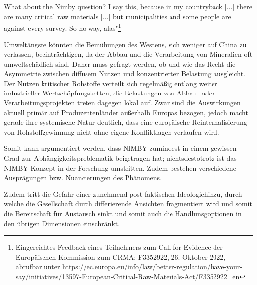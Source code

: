 \documentclass[12pt,a4paper,oneside]{book} %
\begin{document}
{\glqq What about the Nimby question? I say this, because in my countryback [...] there are many critical raw materials [...] but municipalities and some people are against every survey. So no way, alas"\grqq \footnote{Eingereichtes Feedback eines Teilnehmers zum Call for Evidence der Europäischen Kommission zum CRMA; F3352922, 26. Oktober 2022, abrufbar unter https://ec.europa.eu/info/law/better-regulation/have-your-say/initiatives/13597-European-Critical-Raw-Materials-Act/F3352922_en}

Umweltängste könnten die Bemühungen des Westens, sich weniger auf China zu verlassen, beeinträchtigen, da der Abbau und die Verarbeitung von Mineralien oft umweltschädlich sind. Daher muss gefragt werden, ob und wie das Recht die Asymmetrie zwischen diffusem Nutzen und konzentrierter Belastung ausgleicht. Der Nutzen kritischer Rohstoffe verteilt sich regelmäßig entlang weiter industrieller Wertschöpfungsketten, die Belastungen von Abbau- oder Verarbeitungsprojekten treten dagegen lokal auf. Zwar sind die Auswirkungen aktuell primär auf Produzentenländer außerhalb Europas bezogen, jedoch macht gerade ihre systemische Natur deutlich, dass eine europäische Reinternalisierung von Rohstoffgewinnung nicht ohne eigene Konfliktlagen verlaufen wird.

Somit kann argumentiert werden, dass NIMBY zumindest in einem gewissen Grad zur Abhängigkeitsproblematik beigetragen hat; nichtsdestotrotz ist das NIMBY-Konzept in der Forschung umstritten.\autocite{ Umweltpsychologie 2011 2, S. 37-51} Zudem bestehen verschiedene Ausprägungen bzw. Nuancierungen des Phänomens.\autocite{https://miningbeyondhotair.org/2024/10/01/beyond-stereotypes-in-nimbyism-the-nuances-of-local-resistance-and-common-good-in-europes-green-transition/}

Zudem tritt die Gefahr einer \glqq zunehmend post-faktischen Ideologie\grqq hinzu, durch welche die Gesellschaft durch differierende Ansichten fragmentiert wird und somit die Bereitschaft für Austausch sinkt und somit auch die Handlunsgoptionen in den übrigen Dimensionen einschränkt.\autocite{Frenz 2025, S. 95}

}
\end{document}
